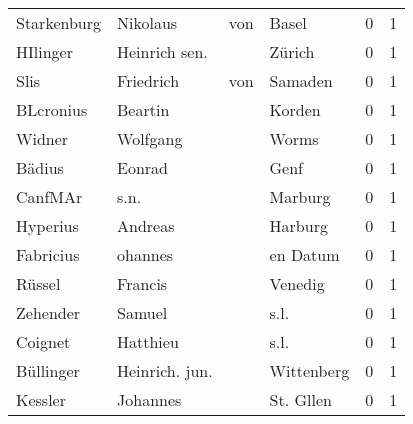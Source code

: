 \begin{tabular}{llllrr}
              Starkenburg &                           Nikolaus &         von &                                       Basel &          0 &         1 \\
                 HIlinger &                      Heinrich sen. &             &                                      Zürich &          0 &         1 \\
                     Slis &                          Friedrich &         von &                                     Samaden &          0 &         1 \\
                BLcronius &                            Beartin &             &                                      Korden &          0 &         1 \\
                   Widner &                           Wolfgang &             &                                       Worms &          0 &         1 \\
                   Bädius &                             Eonrad &             &                                        Genf &          0 &         1 \\
                  CanfMAr &                               s.n. &             &                                     Marburg &          0 &         1 \\
                 Hyperius &                            Andreas &             &                                     Harburg &          0 &         1 \\
                Fabricius &                            ohannes &             &                                    en Datum &          0 &         1 \\
                   Rüssel &                            Francis &             &                                     Venedig &          0 &         1 \\
                 Zehender &                             Samuel &             &                                        s.l. &          0 &         1 \\
                  Coignet &                           Hatthieu &             &                                        s.l. &          0 &         1 \\
                Büllinger &                     Heinrich. jun. &             &                                  Wittenberg &          0 &         1 \\
                  Kessler &                           Johannes &             &                                   St. Gllen &          0 &         1 \\

\end{tabular}
